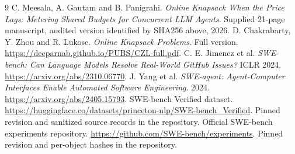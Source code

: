 \documentclass[11pt]{article}
\begin{document}
\begin{thebibliography}{9}
 C. Meesala, A. Gautam and B. Panigrahi. \emph{Online Knapsack When the Price Lags: Metering Shared Budgets for Concurrent LLM Agents}. Supplied 21-page manuscript, audited version identified by SHA256 above, 2026.
 D. Chakrabarty, Y. Zhou and R. Lukose. \emph{Online Knapsack Problems}. Full version. \url{https://deeparnab.github.io/PUBS/CZL-full.pdf}.
 C. E. Jimenez et al. \emph{SWE-bench: Can Language Models Resolve Real-World GitHub Issues?} ICLR 2024. \url{https://arxiv.org/abs/2310.06770}.
 J. Yang et al. \emph{SWE-agent: Agent-Computer Interfaces Enable Automated Software Engineering}. 2024. \url{https://arxiv.org/abs/2405.15793}.
 SWE-bench Verified dataset. \url{https://huggingface.co/datasets/princeton-nlp/SWE-bench_Verified}. Pinned revision and sanitized source records in the repository.
 Official SWE-bench experiments repository. \url{https://github.com/SWE-bench/experiments}. Pinned revision and per-object hashes in the repository.
\end{thebibliography}
\end{document}
